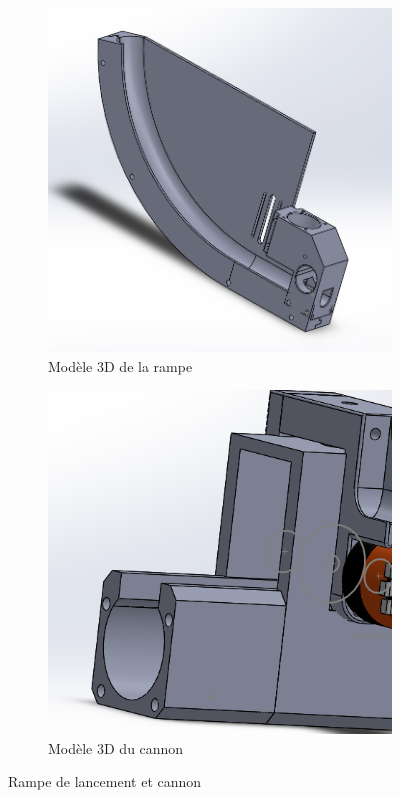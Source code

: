 \begin{figure}[h!]
    \centering

    \begin{subfigure}{0.4\linewidth}
        \centering
        \includegraphics[width=\linewidth]{img/s2/cad/rampe}
        \caption{Modèle 3D de la rampe}
        \label{fig:s2-cad-rampe}
    \end{subfigure}
    \begin{subfigure}{0.4\linewidth}
        \centering
        \includegraphics[width=\linewidth]{img/s2/cad/cannon}
        \caption{Modèle 3D du cannon}
        \label{fig:s2-cad-cannon}
    \end{subfigure}
    \caption{Rampe de lancement et cannon}
    \label{fig:s2-cad-rampe-cannon}
\end{figure}

